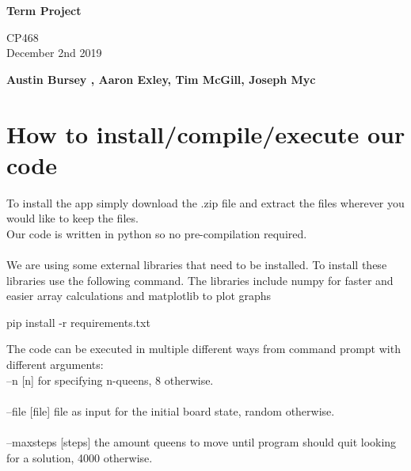 \documentclass{article}
\begin{document}
\begin{titlepage}
  \pagestyle{fancy}
  \thispagestyle{fancy}
   \begin{center}
       \vspace*{1cm}
 
      \Huge
       \textbf{Term Project}
 
       \vspace{0.5cm}
       \Large
        CP468 \\ December 2nd 2019
 
       \vspace{1.5cm}
 
       \textbf{Austin Bursey , Aaron Exley, Tim McGill, Joseph Myc}
 
       \vfill

       \vspace{0.8cm}
 
   \end{center}
\end{titlepage}
\setcounter{page}{2}

\section{How to install/compile/execute our code}
To install the app simply download the .zip file and extract the files wherever you would like to keep the files.
\\
Our code is written in python so no pre-compilation required.\\
\\
We are using some external libraries that need to be installed.  To install these libraries use the following command. The libraries include numpy for faster and easier array calculations and matplotlib to plot graphs\\
\begin{center}
pip install -r requirements.txt
\end{center}
The code can be executed in multiple different ways from command prompt with different arguments:\\

--n [n] for specifying n-queens, 8 otherwise.\\
\\
--file [file] file as input for the initial board state, random otherwise.\\
\\
--maxsteps [steps] the amount queens to move until program should quit looking for a solution, 4000 otherwise. \\
\end{document}
